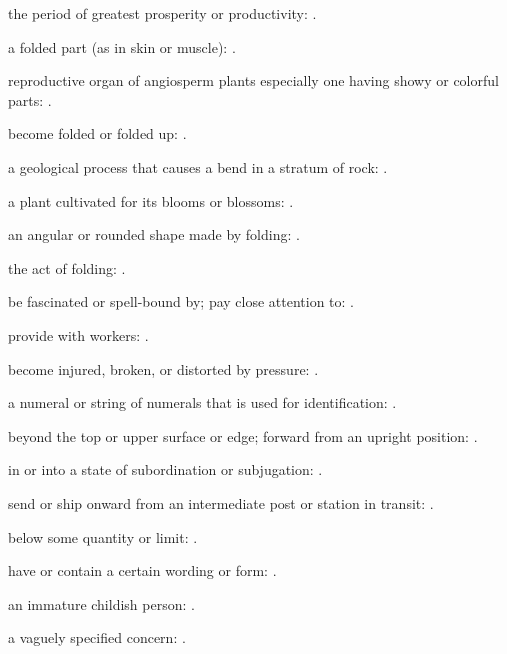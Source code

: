   the period of greatest prosperity or productivity:   .

  a folded part (as in skin or muscle):   .

  reproductive organ of angiosperm plants especially one having showy or colorful parts:   .

  become folded or folded up:   .

  a geological process that causes a bend in a stratum of rock:   .

  a plant cultivated for its blooms or blossoms: .

  an angular or rounded shape made by folding:   .

  the act of folding:   .

  be fascinated or spell-bound by; pay close attention to:   .

  provide with workers: .

  become injured, broken, or distorted by pressure: .

  a numeral or string of numerals that is used for identification:   .

  beyond the top or upper surface or edge; forward from an upright position: .

  in or into a state of subordination or subjugation: .

  send or ship onward from an intermediate post or station in transit:   .

  below some quantity or limit: .

  have or contain a certain wording or form:   .

  an immature childish person:   .

  a vaguely specified concern:   .

